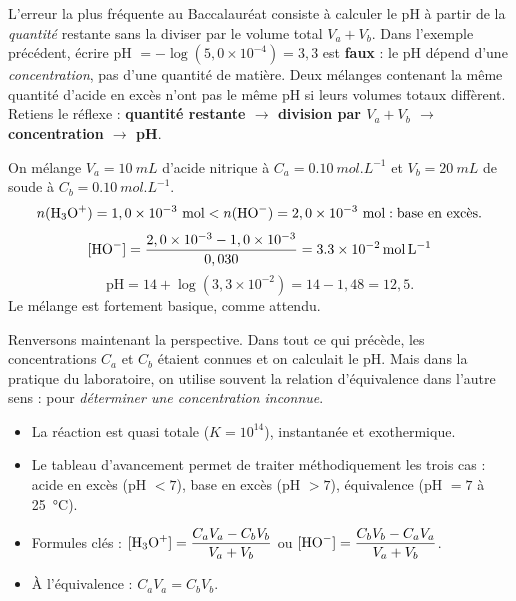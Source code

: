 \documentclass[11pt]{article}
\newcounter{popsec}
\newcounter{popsub}
\newcommand{\courssub}[1]{%
  \stepcounter{popsub}%
  \par\vspace{9pt}\noindent{\popxbold\fontsize{11.5}{13}\selectfont\color{popink}{\color{poporange}\thepopsec.\thepopsub}\hspace{6pt}#1}\par\nopagebreak\vspace{4pt}
}
\begin{document}
\begin{attention}
L'erreur la plus fréquente au Baccalauréat consiste à calculer le pH à partir de la \emph{quantité} restante sans la diviser par le volume total $V_a + V_b$. Dans l'exemple précédent, écrire pH $= -\log(5,0\times 10^{-4}) = 3,3$ est \textbf{faux} : le pH dépend d'une \emph{concentration}, pas d'une quantité de matière. Deux mélanges contenant la même quantité d'acide en excès n'ont pas le même pH si leurs volumes totaux diffèrent. Retiens le réflexe : \textbf{quantité restante $\rightarrow$ division par $V_a + V_b$ $\rightarrow$ concentration $\rightarrow$ pH}.
\end{attention}

\begin{exemplebox}
On mélange $V_a = \SI{10}{mL}$ d'acide nitrique à $C_a = \SI{0,10}{mol.L^{-1}}$ et $V_b = \SI{20}{mL}$ de soude à $C_b = \SI{0,10}{mol.L^{-1}}$.
\[ n(\ce{H3O+}) = 1,0\times 10^{-3}\ \text{mol} < n(\ce{HO-}) = 2,0\times 10^{-3}\ \text{mol} : \text{base en excès.} \]
\[ [\ce{HO-}] = \frac{2,0\times 10^{-3} - 1,0\times 10^{-3}}{0,030} = \SI{3,3e-2}{mol.L^{-1}} \]
\[ \mathrm{pH} = 14 + \log(3,3\times 10^{-2}) = 14 - 1,48 = 12,5. \]
Le mélange est fortement basique, comme attendu.
\end{exemplebox}

\courssub{Vers le dosage acido-basique}

Renversons maintenant la perspective. Dans tout ce qui précède, les concentrations $C_a$ et $C_b$ étaient connues et on calculait le pH. Mais dans la pratique du laboratoire, on utilise souvent la relation d'équivalence dans l'autre sens : pour \emph{déterminer une concentration inconnue}.

\begin{aretenir}
\begin{itemize}
\item La réaction  est quasi totale ($K = 10^{14}$), instantanée et exothermique.
\item Le tableau d'avancement permet de traiter méthodiquement les trois cas : acide en excès (pH $< 7$), base en excès (pH $> 7$), équivalence (pH $= 7$ à \SI{25}{\celsius}).
\item Formules clés : $[\ce{H3O+}] = \dfrac{C_aV_a - C_bV_b}{V_a + V_b}$ ou $[\ce{HO-}] = \dfrac{C_bV_b - C_aV_a}{V_a + V_b}$.
\item À l'équivalence : $C_a V_a = C_b V_b$.
\end{itemize}
\end{aretenir}
\end{document}
